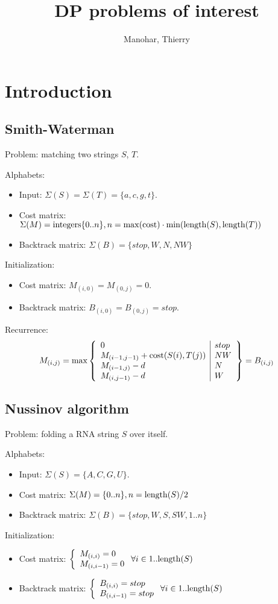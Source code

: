 \documentclass[11pt]{article}
\title{DP problems of interest}
\author{Manohar, Thierry}
\date{}
\def\ul{\begin{itemize}}
\def\ule{\end{itemize}}
\begin{document}
\maketitle
\pagestyle{headings}

\section{Introduction}
\subsection{Smith-Waterman}
Problem: matching two strings $S$, $T$.

Alphabets:\ul
\item Input: $\Sigma(S)=\Sigma(T)=\{a,c,g,t\}$.
\item Cost matrix: $\Sigma(M) = {\rm integers} \{0..n\}, n=\max({\rm cost}) \cdot \min({\rm length}(S),{\rm length}(T))$
\item Backtrack matrix: $\Sigma(B)=\{stop,W,N,NW\}$
\ule

Initialization:\ul
\item Cost matrix: $M_{(i,0)}=M_{(0,j)}=0$.
\item Backtrack matrix: $B_{(i,0)}=B_{(0,j)}=stop$.
\ule

Recurrence:
\[M_{(i,j)}=\max\left\{\begin{array}{l|l}
	0 & stop\\
	M_{(i-1,j-1)}+{\rm cost}(S(i),T(j)) & NW\\
	M_{(i-1,j)}-d & N\\
	M_{(i,j-1)}-d & W
\end{array}\right\}=B_{(i,j)} \]

\newpage
\subsection{Nussinov algorithm}
Problem: folding a RNA string $S$ over itself.

Alphabets:\ul
\item Input: $\Sigma(S)=\{A,C,G,U\}$.
\item Cost matrix: $\Sigma(M)=\{0..n\}, n={\rm length}(S)/2$
\item Backtrack matrix: $\Sigma(B)=\{stop,W,S,SW, 1..n\}$
\ule

Initialization: \ul
\item Cost matrix: $\left\{\begin{array}{l} M_{(i,i)}=0 \\ M_{(i,i-1)}=0 \end{array}\right. \forall i \in 1..{\rm length}(S)$
\item Backtrack matrix: $\left\{\begin{array}{l} B_{(i,i)}=stop \\ B_{(i,i-1)}=stop \end{array}\right.  \forall i \in 1..{\rm length}(S)$
\ule
\end{document}
